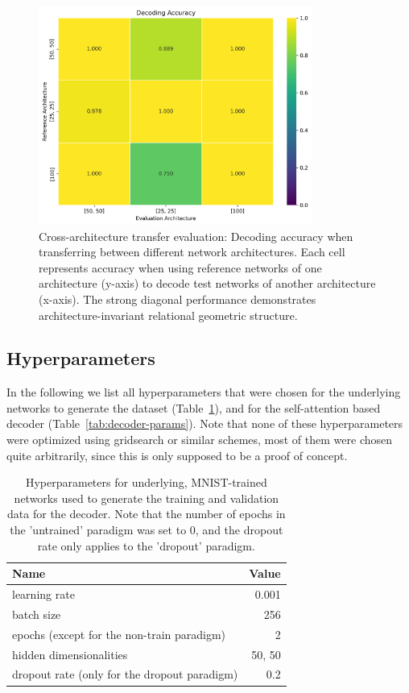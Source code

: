 \documentclass[11pt]{article}
\begin{document}
\begin{figure}[htbp]
\centering
\includegraphics[width=0.8\textwidth]{figures/cross_architecture_heatmap_accuracy.png}
\caption{Cross-architecture transfer evaluation: Decoding accuracy when transferring between different network architectures. Each cell represents accuracy when using reference networks of one architecture (y-axis) to decode test networks of another architecture (x-axis). The strong diagonal performance demonstrates architecture-invariant relational geometric structure.}
\label{fig:cross-architecture}
\end{figure}

\subsection{Hyperparameters}

In the following we list all hyperparameters that were chosen for the underlying networks to generate the dataset (Table~\ref{tab:mnist-params}), and for the self-attention based decoder (Table~\ref{tab:decoder-params}). Note that none of these hyperparameters were optimized using gridsearch or similar schemes, most of them were chosen quite arbitrarily, since this is only supposed to be a proof of concept.

\begin{table}[htbp]
\centering
\begin{tabular}{lr}
\toprule
Name & Value \\
\midrule
learning rate & 0.001 \\
batch size & 256 \\
epochs (except for the non-train paradigm) & 2 \\
hidden dimensionalities & 50, 50 \\
dropout rate (only for the dropout paradigm) & 0.2 \\
\bottomrule
\end{tabular}
\caption{Hyperparameters for underlying, MNIST-trained networks used to generate the training and validation data for the decoder. Note that the number of epochs in the 'untrained' paradigm was set to 0, and the dropout rate only applies to the 'dropout' paradigm.}
\label{tab:mnist-params}
\end{table}
\end{document}

